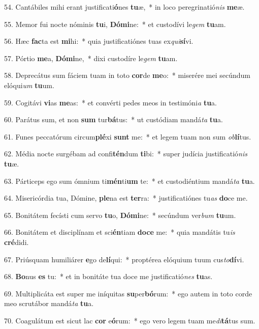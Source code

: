 54. Cantábiles mihi erant justificati\textbf{ó}nes \textbf{tu}æ,~*  in loco peregrinatió\textit{nis} \textbf{me}æ.\

55. Memor fui nocte nóminis \textbf{tu}i, \textbf{Dó}\textbf{mi}ne:~*  et custodívi le\textit{gem} \textbf{tu}am.\

56. Hæc \textbf{fac}ta est \textbf{mi}hi:~*  quia justificatiónes tuas ex\textit{qui}\textbf{sí}vi.\

57. Pórtio \textbf{me}a, \textbf{Dó}\textbf{mi}ne,~*  dixi custodíre le\textit{gem} \textbf{tu}am.\

58. Deprecátus sum fáciem tuam in toto \textbf{cor}de \textbf{me}o:~*  miserére mei secúndum elóqui\textit{um} \textbf{tu}um.\

59. Cogitávi \textbf{vi}as \textbf{me}as:~*  et convérti pedes meos in testimóni\textit{a} \textbf{tu}a.\

60. Parátus sum, et non \textbf{sum} tur\textbf{bá}tus:~*  ut custódiam mandá\textit{ta} \textbf{tu}a.\

61. Funes peccatórum circum\textbf{plé}xi \textbf{sunt} me:~*  et legem tuam non sum \textit{ob}\textbf{lí}tus.\

62. Média nocte surgébam ad confi\textbf{tén}dum \textbf{ti}bi:~*  super judícia justificatió\textit{nis} \textbf{tu}æ.\

63. Párticeps ego sum ómnium ti\textbf{mén}ti\textbf{um} te:~*  et custodiéntium mandá\textit{ta} \textbf{tu}a.\

64. Misericórdia tua, Dómine, \textbf{ple}na est \textbf{ter}ra:~*  justificatiónes tu\textit{as} \textbf{do}ce me.\

65. Bonitátem fecísti cum servo \textbf{tu}o, \textbf{Dó}\textbf{mi}ne:~*  secúndum ver\textit{bum} \textbf{tu}um.\

66. Bonitátem et disciplínam et sci\textbf{én}tiam \textbf{do}\textbf{ce} me:~*  quia mandátis tu\textit{is} \textbf{cré}didi.\

67. Priúsquam humiliárer \textbf{e}go de\textbf{lí}qui:~*  proptérea elóquium tuum cus\textit{to}\textbf{dí}vi.\

68. \textbf{Bo}nus \textbf{es} tu:~*  et in bonitáte tua doce me justificatió\textit{nes} \textbf{tu}as.\

69. Multiplicáta est super me iníquitas \textbf{su}per\textbf{bó}rum:~*  ego autem in toto corde meo scrutábor mandá\textit{ta} \textbf{tu}a.\

70. Coagulátum est sicut lac \textbf{cor} e\textbf{ó}rum:~*  ego vero legem tuam me\textit{di}\textbf{tá}tus sum.\

